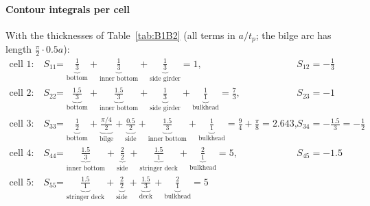 \paragraph{Contour integrals per cell}
With the thicknesses of Table~\ref{tab:B1B2} (all terms in $a/t_p$; the bilge arc has length $\frac{\pi}{2}\cdot0.5a$):
\begin{align*}
\text{cell 1:}\quad S_{11} &= \underbrace{\tfrac{1}{3}}_{\text{bottom}}
   + \underbrace{\tfrac{1}{3}}_{\text{inner bottom}}
   + \underbrace{\tfrac{1}{3}}_{\text{side girder}} = 1,
   && S_{12} = -\tfrac{1}{3}\\
\text{cell 2:}\quad S_{22} &= \underbrace{\tfrac{1.5}{3}}_{\text{bottom}}
   + \underbrace{\tfrac{1.5}{3}}_{\text{inner bottom}}
   + \underbrace{\tfrac{1}{3}}_{\text{side girder}}
   + \underbrace{\tfrac{1}{1}}_{\text{bulkhead}} = \tfrac{7}{3},
   && S_{23} = -1\\
\text{cell 3:}\quad S_{33} &= \underbrace{\tfrac{1}{2}}_{\text{bottom}}
   + \underbrace{\tfrac{\pi/4}{2}}_{\text{bilge}}
   + \underbrace{\tfrac{0.5}{2}}_{\text{side}}
   + \underbrace{\tfrac{1.5}{3}}_{\text{inner bottom}}
   + \underbrace{\tfrac{1}{1}}_{\text{bulkhead}}
   = \tfrac{9}{4}+\tfrac{\pi}{8} = 2.643,
   && S_{34} = -\tfrac{1.5}{3}=-\tfrac{1}{2}\\
\text{cell 4:}\quad S_{44} &= \underbrace{\tfrac{1.5}{3}}_{\text{inner bottom}}
   + \underbrace{\tfrac{2}{2}}_{\text{side}}
   + \underbrace{\tfrac{1.5}{1}}_{\text{stringer deck}}
   + \underbrace{\tfrac{2}{1}}_{\text{bulkhead}} = 5,
   && S_{45} = -1.5\\
\text{cell 5:}\quad S_{55} &= \underbrace{\tfrac{1.5}{1}}_{\text{stringer deck}}
   + \underbrace{\tfrac{2}{2}}_{\text{side}}
   + \underbrace{\tfrac{1.5}{3}}_{\text{deck}}
   + \underbrace{\tfrac{2}{1}}_{\text{bulkhead}} = 5
\end{align*}

